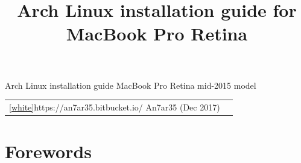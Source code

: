 
\title{Arch Linux installation guide for MacBook Pro Retina}
\color{dark}
\setlength{\parindent}{0em}
\setlength{\parskip}{0.5em}
\renewcommand{\baselinestretch}{1.2}


\sloppy
\begin{headerborder}
    \centering
    \begin{LARGE}
        Arch Linux installation guide\linebreak
        MacBook Pro Retina mid-2015 model\linebreak
        \raisebox{-0.2\height}{\openiconic[]}
        \par
    \end{LARGE}
    \begin{tabularx}{\textwidth}{lR}
        \cref{white}{https://an7ar35.bitbucket.io/}{ An7ar35} (Dec 2017) &
    \end{tabularx}
\end{headerborder}


    
\normalsize\justify
\tableofcontents
\clearpage

\section{Forewords}

